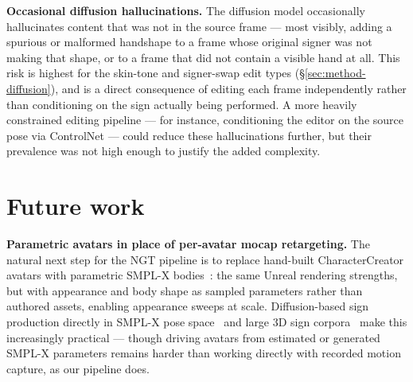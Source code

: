 \textbf{Occasional diffusion hallucinations.} The diffusion model
occasionally hallucinates content that was not in the source frame ---
most visibly, adding a spurious or malformed handshape to a frame whose
original signer was not making that shape, or to a frame that did not
contain a visible hand at all. This risk is highest for the skin-tone and
signer-swap edit types (\S\ref{sec:method-diffusion}), and is a direct
consequence of editing each frame independently rather than conditioning
on the sign actually being performed.
 A more heavily
constrained editing pipeline --- for instance, conditioning the editor
on the source pose via ControlNet --- could reduce these hallucinations
further, but their prevalence was not high enough to justify the added
complexity.

\section{Future work}
\label{sec:future-work}
\textbf{Parametric avatars in place of per-avatar mocap retargeting.} The
natural next step for the NGT pipeline is to replace hand-built
CharacterCreator avatars with parametric SMPL-X
bodies~\cite{pavlakosExpressiveBodyCapture2019a}: the same Unreal rendering
strengths, but with appearance and body shape as sampled parameters rather
than authored assets, enabling appearance sweeps at scale. Diffusion-based
sign production directly in SMPL-X pose
space~\cite{baltatzisNeuralSignActors2024a} and large 3D sign
corpora~\cite{yuSignAvatarsLargeScale3D2025} make this increasingly
practical --- though driving avatars from estimated or generated SMPL-X
parameters remains harder than working directly with recorded motion
capture, as our pipeline does.

